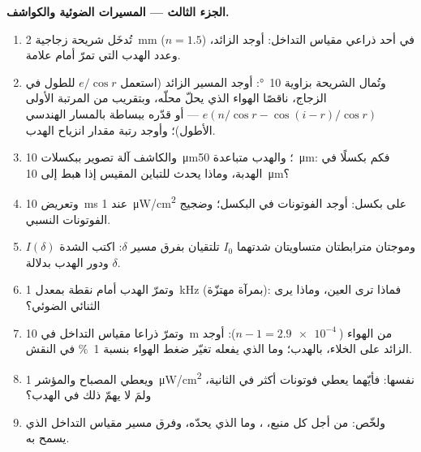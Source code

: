 \begin{problem}
\medskip
\noindent\textbf{الجزء الثالث --- المسيرات الضوئية والكواشف.}
\begin{enumerate}[resume]
  \item تُدخَل شريحة زجاجية \qty{2}{mm} ($n = 1.5$) في أحد ذراعي
        مقياس التداخل: أوجد  الزائد، وعدد
        الهدب التي تمرّ أمام علامة.
  \item وتُمال الشريحة بزاوية \qty{10}{\degree}: أوجد المسير الزائد (استعمل $e/\cos r$
        للطول في الزجاج، ناقصًا الهواء الذي يحلّ محلّه، وبتقريب
        من المرتبة الأولى $e(n/\cos r - \cos(i - r)/\cos r)$ --- أو قدّره
        ببساطة بالمسار الهندسي الأطول)؛ وأوجد رتبة مقدار
        انزياح الهدب.
  \item والكاشف آلة تصوير ببكسلات \qty{10}{\micro m}؛ والهدب
        متباعدة \qty{50}{\micro m}: فكم بكسلًا في الهدبة، وماذا
        يحدث للتباين المقيس إذا هبط  إلى
        \qty{10}{\micro m}؟
  \item وتعريض \qty{10}{ms} عند \qty{1}{\micro W/cm^2} على بكسل: أوجد الفوتونات في
        البكسل؛ وضجيج الفوتونات النسبي.
  \item وموجتان مترابطتان متساويتان شدتهما $I_0$ تلتقيان بفرق
        مسير $\delta$: اكتب الشدة $I(\delta)$ ودور
        الهدب بدلالة $\delta$.
  \item وتمرّ الهدب أمام نقطة بمعدل \qty{1}{kHz} (بمرآة
        مهتزّة): فماذا ترى العين، وماذا يرى الثنائي الضوئي؟
  \item وتمرّ ذراعا مقياس التداخل في \qty{10}{m} من الهواء ($n - 1 =
        \qty{2.9e-4}{}$): أوجد  الزائد على الخلاء، بالهدب؛
        وما الذي يفعله تغيّر ضغط الهواء بنسبة \qty{1}{\%} في النقش.
  \item ويعطي المصباح والمؤشر \qty{1}{\micro W/cm^2} نفسها: فأيّهما
        يعطي فوتونات أكثر في الثانية، ولمَ لا يهمّ ذلك في
        الهدب؟
  \item ولخّص: من أجل كل منبع، ، وما الذي يحدّه،
        وفرق مسير مقياس التداخل الذي يسمح به.
\end{enumerate}
\end{problem}
